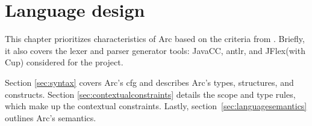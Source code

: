 \chapter{Language design}\label{cha:languagedesign}
This chapter prioritizes characteristics of Arc based on the criteria from \cite{Sebesta2016}. Briefly, it also covers the lexer and parser generator tools: JavaCC, \gls{antlr}, and JFlex(with Cup) considered for the project.

Section \ref{sec:syntax} covers Arc's \gls{cfg} and describes Arc's types, structures, and constructs. Section \ref{sec:contextualconstraints} details the scope and type rules, which make up the contextual constraints. Lastly, section~\ref{sec:languagesemantics} outlines Arc's semantics.







